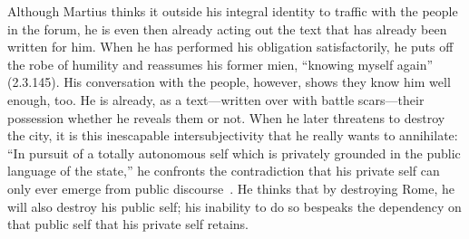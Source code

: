 Although Martius thinks it outside his integral identity to traffic with the people in the forum, he is even then already acting out the text that has already been written for him.
When he has performed his obligation satisfactorily, he puts off the robe of humility and reassumes his former mien, ``knowing myself again'' (2.3.145).
His conversation with the people, however, shows they know him well enough, too.
He is already, as a text---written over with battle scars---their possession whether he reveals them or not.
When he later threatens to destroy the city, it is this inescapable intersubjectivity that he really wants to annihilate:
``In pursuit of a totally autonomous self which is privately grounded in the public language of the state,'' he confronts the contradiction that his private self can only ever emerge from public discourse~\cite[229]{tennenhouse_coriolanus:_1986}.
He thinks that by destroying Rome, he will also destroy his public self; his inability to do so bespeaks the dependency on that public self that his private self retains.

